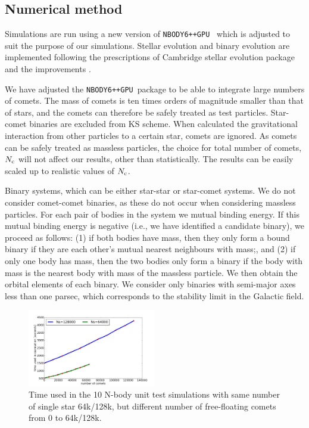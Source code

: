 \documentclass[usenatbib]{mnras}
\newcommand{\ncomets}{N_{\rm c}}
\newcommand{\nb}{\texttt{NBODY6++GPU}}
\begin{document}
\subsection{Numerical method}

Simulations are run using a new version of \nb\ \citep{Wang:2015ab} which is adjusted to suit the purpose of our simulations. Stellar evolution and binary evolution are implemented following the prescriptions of Cambridge stellar evolution package and the improvements \citep{Eggleton:1989aa, Hurley:2000aa, Hurley:2005aa, Belczynski:2007aa}.

We have adjusted the \nb\ package to be able to integrate large numbers of comets. The mass of comets is ten times orders of magnitude smaller than that of stars, and the comets can therefore be safely treated as test particles. Star-comet binaries are excluded from KS scheme. When calculated the gravitational interaction from other particles to a certain star, comets are ignored. %
As comets can be safely treated as massless particles, the choice for total number of comets, $\ncomets$ will not affect our results, other than statistically. The results can be easily scaled up to realistic values of $\ncomets$. 

Binary systems, which can be either star-star or star-comet systems. We do not consider comet-comet binaries, as these do not occur when considering massless particles. For each pair of bodies in the system we mutual binding energy. If this mutual binding energy is negative (i.e., we have identified a candidate binary), we proceed as follows: (1) if both bodies have mass, then they only form a bound binary if they are each other's mutual nearest neighbours with mass;, and (2) if only one body has mass, then the two bodies only form a binary if the body with mass is the nearest body with mass of the massless particle. We then obtain the orbital elements of each binary. We consider only binaries with semi-major axes less than one parsec, which corresponds to the stability limit in the Galactic field. 

\begin{figure}
  \centering
  \includegraphics[width=0.5\textwidth,height=!]{time_used.pdf}
  \caption{Time used in the 10 N-body unit test simulations with same number of single star 64k/128k, but different number of free-floating comets from 0 to 64k/128k.}
  \label{fig:time_used}
\end{figure}
\end{document}
